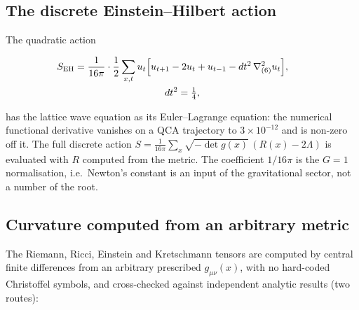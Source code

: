 \documentclass[aps,prd,twocolumn,amsmath,amssymb,superscriptaddress,nofootinbib,floatfix]{revtex4-2}
\begin{document}
\subsection{The discrete Einstein--Hilbert
action}\label{the-discrete-einsteinhilbert-action}

The quadratic action \cite{ref33}

\begin{multline}
    S_{\rm EH} = \frac{1}{16\pi}\cdot\frac12\sum_{x,t} u_t\Big[u_{t+1} - 2u_t + u_{t-1} - dt^2\,\nabla^2_{(6)} u_t\Big],\qquad \\
    dt^2 = \tfrac14,
\end{multline}

has the lattice wave equation as its Euler--Lagrange equation: the
numerical functional derivative vanishes on a QCA trajectory to
\(3\times10^{-12}\) and is non-zero off it. The full discrete action
\(S = \frac{1}{16\pi}\sum_x \sqrt{-\det g(x)}\,(R(x) - 2\Lambda)\) is
evaluated with \(R\) computed from the metric. The coefficient
\(1/16\pi\) is the \(G=1\) normalisation, i.e.~Newton's constant is an
input of the gravitational sector, not a number of the root.

\subsection{Curvature computed from an arbitrary
metric}\label{curvature-computed-from-an-arbitrary-metric}

The Riemann, Ricci, Einstein and Kretschmann tensors are computed by
central finite differences from an arbitrary prescribed
\(g_{\mu\nu}(x)\), with no hard-coded Christoffel symbols, and
cross-checked against independent analytic results (two routes):
\end{document}
